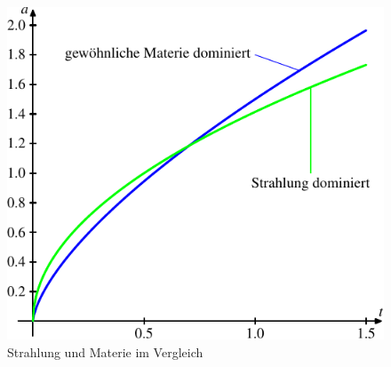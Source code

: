 \begin{refsection}
\begin{figure}
	\centering
	\includegraphics{friedmann/images/friedmann-3.pdf}
	\caption{Strahlung und Materie im Vergleich
		\label{friedmann:strahlungMaterie}}
\end{figure}


\end{refsection}
